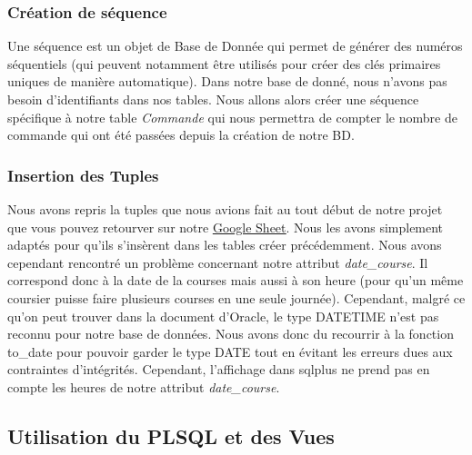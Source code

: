 \documentclass[french]{article}
\begin{document}
        \subsubsection*{Création de séquence}
            Une séquence est un objet de Base de Donnée qui permet de générer des numéros séquentiels (qui peuvent notamment être utilisés pour créer des clés primaires uniques de manière automatique). Dans notre base de donné, nous n'avons pas besoin d'identifiants dans nos tables. Nous allons alors créer une séquence spécifique à notre table \textit{Commande} qui nous permettra de compter le nombre de commande qui ont été passées depuis la création de notre BD.

        \subsubsection*{Insertion des Tuples}
            Nous avons repris la tuples que nous avions fait au tout début de notre projet que vous pouvez retourver sur notre \href{https://docs.google.com/spreadsheets/d/1HeSNFvLN3-yMfWHoYLVumzOeQpHXJHynqVBusbvl6EQ/edit?usp=sharing}{\underline{Google Sheet}}. Nous les avons simplement adaptés pour qu'ils s'insèrent dans les tables créer précédemment.\newline
            Nous avons cependant rencontré un problème concernant notre attribut \textit{date\_course}. Il correspond donc à la date de la courses mais aussi à son heure (pour qu'un même coursier puisse faire plusieurs courses en une seule journée). Cependant, malgré ce qu'on peut trouver dans la document d'Oracle, le type DATETIME n'est pas reconnu pour notre base de données. Nous avons donc du recourrir à la fonction to\_date pour pouvoir garder le type DATE tout en évitant les erreurs dues aux contraintes d'intégrités. Cependant, l'affichage dans sqlplus ne prend pas en compte les heures de notre attribut \textit{date\_course}. 

        \subsection*{Utilisation du PLSQL et des Vues}
\end{document}
